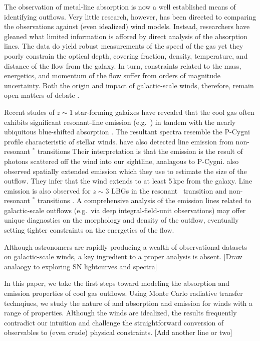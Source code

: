 \documentclass[12pt,preprint]{aastex}
\begin{document}
The observation of metal-line absorption is now a well established
means of identifying outflows. Very little research,
however,  has been directed
to comparing the observations against (even idealized) wind
models.  Instead, researchers have gleaned what limited information
is affored by direct analysis of the absorption lines.  The data do yield
robust measurements of the speed of the gas yet they poorly constrain the
optical depth, covering fraction, density, temperature, and distance
of the flow from the galaxy.   In turn, constraints related to the
mass, energetics, and momentum of the flow suffer from
orders of magnitude uncertainty.  Both the origin and impact of
galactic-scale winds, therefore, remain open matters of debate
\citep{debate}.

Recent studes of $z \sim 1$ star-forming galaixes have revealed that
the cool gas often exhibits significant resonant-line emission (e.g.\
) in
tandem with the nearly ubiquitous blue-shifted absorption
\citep{wcp+09,rubin09,rubin+10b}.  The resultant spectra resemble the P-Cygni
profile characteristic of stellar winds.
\cite{rubin+10a} have also detected line
emission from non-resonant $^*$ transitions 
Their interpretation is that the emission is the result of photons
scattered off the wind into our sightline, analagous to P-Cygni.
\cite{rubin+10a} also observed spatially extended \ion{Mg}{2} emission
which they use to estimate the size of the outflow.  They infer that
the wind extends to at least 5\,kpc from the galaxy.  Line emission is
also observed for $z \sim 3$ LBGs in the resonant \lya\ transition
and non-resonant \ion{Si}{2}$^*$ transitions \citep{prs+02,shapley03}.
A comprehensive analysis of the emission lines
related to galactic-scale outflows
(e.g.\ via deep integral-field-unit observations) may offer unique
diagnostics on the morphology and density of the outflow, eventually
setting tighter constraints on the energetics of the flow.  

Although astronomers are rapidly producing a wealth of observational
datasets on galactic-scale winds, a key ingredient to a proper
analysis is absent.
[Draw analaogy to exploring SN lightcurves and spectra]

In this paper, we take the first steps toward modeling the absorption
and emission properties of cool gas outflows.  Using Monte Carlo
radiative transfer technqiues, we study the nature of \ion{Mg}{2} and
\ion{Fe}{2} absorption and emission for winds with a range of
properties.  Although the winds are idealized, the results frequently
contradict our intuition and 
challenge the straightforward conversion of observables to (even crude) physical
constraints.  [Add another line or two]
\end{document}
